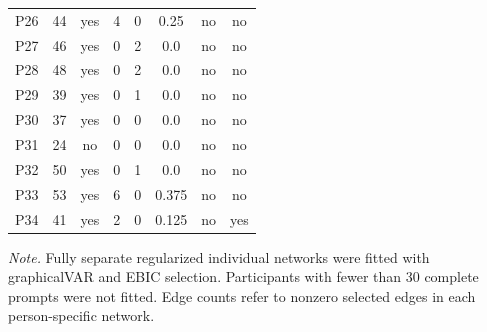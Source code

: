 \begin{table}[H]
\begin{tabular*}{\textwidth}{@{\extracolsep{\fill}}lccccccc@{}}
P26 & 44 & yes & 4 & 0 & 0.25 & no & no \\
P27 & 46 & yes & 0 & 2 & 0.0 & no & no \\
P28 & 48 & yes & 0 & 2 & 0.0 & no & no \\
P29 & 39 & yes & 0 & 1 & 0.0 & no & no \\
P30 & 37 & yes & 0 & 0 & 0.0 & no & no \\
P31 & 24 & no & 0 & 0 & 0.0 & no & no \\
P32 & 50 & yes & 0 & 1 & 0.0 & no & no \\
P33 & 53 & yes & 6 & 0 & 0.375 & no & no \\
P34 & 41 & yes & 2 & 0 & 0.125 & no & yes \\
\bottomrule
\end{tabular*}
\par\vspace{3pt}\noindent\parbox{\textwidth}{\scriptsize\textit{Note.} Fully separate regularized individual networks were fitted with graphicalVAR and EBIC selection. Participants with fewer than 30 complete prompts were not fitted. Edge counts refer to nonzero selected edges in each person-specific network.}
\endgroup
\end{table}
